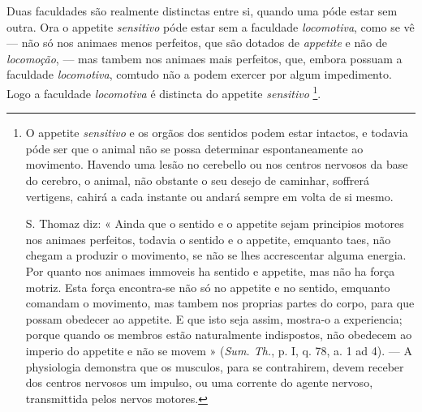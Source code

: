  
Duas faculdades são realmente distinctas entre si, quando uma póde estar sem outra. Ora o appetite \emph{sensitivo} póde estar sem a faculdade \emph{locomotiva}, como se vê --- não só nos animaes menos perfeitos, que são dotados de \emph{appetite} e não de \emph{locomoção}, --- mas tambem nos animaes mais perfeitos, que, embora possuam a faculdade \emph{locomotiva}, comtudo não a podem exercer por algum impedimento. Logo a faculdade \emph{locomotiva} é distincta do appetite \emph{sensitivo} \footnote{O appetite \emph{sensitivo} e os orgãos dos sentidos podem estar intactos, e todavia póde ser que o animal não se possa determinar espontaneamente ao movimento. Havendo uma lesão no cerebello ou nos centros nervosos da base do cerebro, o animal, não obstante o seu desejo de caminhar, soffrerá vertigens, cahirá a cada instante ou andará sempre em volta de si mesmo.\par S. Thomaz diz: « Ainda que o sentido e o appetite sejam principios motores nos animaes perfeitos, todavia o sentido e o appetite, emquanto taes, não chegam a produzir o movimento, se não se lhes accrescentar alguma energia. Por quanto nos animaes immoveis ha sentido e appetite, mas não ha força motriz. Esta força encontra-se não só no appetite e no sentido, emquanto comandam o movimento, mas tambem nos proprias partes do corpo, para que possam obedecer ao appetite. E que isto seja assim, mostra-o a experiencia; porque quando os membros estão naturalmente indispostos, não obedecem ao imperio do appetite e não se movem » (\emph{Sum. Th.}, p. I, q. 78, a. 1 ad 4). --- A physiologia demonstra que os musculos, para se contrahirem, devem receber dos centros nervosos um impulso, ou uma corrente do agente nervoso, transmittida pelos nervos motores.}.


